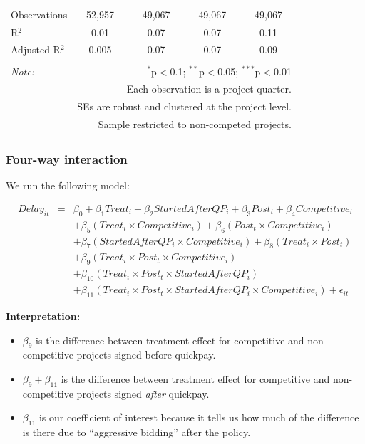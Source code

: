 \documentclass[
]{article}
\providecommand{\tightlist}{%
  \setlength{\itemsep}{0pt}\setlength{\parskip}{0pt}}
\begin{document}
\begin{table}[H]
\begin{tabular}{@{\extracolsep{-2pt}}lcccc}
Observations & 52,957 & 49,067 & 49,067 & 49,067 \\ 
R$^{2}$ & 0.01 & 0.07 & 0.07 & 0.11 \\ 
Adjusted R$^{2}$ & 0.005 & 0.07 & 0.07 & 0.09 \\ 
\hline 
\hline \\[-1.8ex] 
\textit{Note:}  & \multicolumn{4}{r}{$^{*}$p$<$0.1; $^{**}$p$<$0.05; $^{***}$p$<$0.01} \\ 
 & \multicolumn{4}{r}{Each observation is a project-quarter.} \\ 
 & \multicolumn{4}{r}{SEs are robust and clustered at the project level.} \\ 
 & \multicolumn{4}{r}{Sample restricted to non-competed projects.} \\ 
\end{tabular} 
\end{table}

\hypertarget{four-way-interaction}{%
\subsubsection{Four-way interaction}\label{four-way-interaction}}

We run the following model:

\[\begin{aligned} Delay_{it} &=& \beta_0 +\beta_1 Treat_i+ \beta_2 StartedAfterQP_i+ \beta_3 Post_t+ \beta_4 Competitive_i\\ && +  \beta_5 (Treat_i \times Competitive_i) + \beta_6 (Post_t \times Competitive_i)\\ && +  \beta_7 (StartedAfterQP_i \times Competitive_i) +\beta_8 (Treat_i \times Post_t)\\ && + \beta_9 (Treat_i \times Post_t \times Competitive_i) \\ && + \beta_{10} (Treat_i \times Post_t \times StartedAfterQP_i )\\ && + \beta_{11} (Treat_i \times Post_t \times StartedAfterQP_i \times Competitive_i) + \epsilon_{it} \end{aligned}\]

\textbf{Interpretation:}

\begin{itemize}
\tightlist
\item
  \(\beta_9\) is the difference between treatment effect for competitive
  and non-competitive projects signed before quickpay.
\item
  \(\beta_9 + \beta_{11}\) is the difference between treatment effect
  for competitive and non-competitive projects signed \emph{after}
  quickpay.
\item
  \(\beta_{11}\) is our coefficient of interest because it tells us how
  much of the difference is there due to ``aggressive bidding'' after
  the policy.
\end{itemize}
\end{document}

